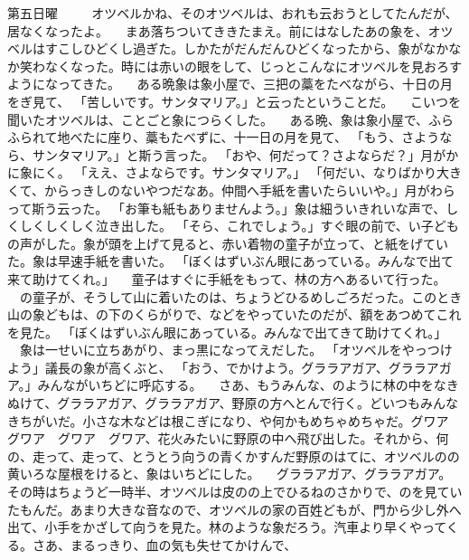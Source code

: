 第五日曜
　
　オツベルかね、そのオツベルは、おれも云おうとしてたんだが、居なくなったよ。
　まあ落ちついてききたまえ。前にはなしたあの象を、オツベルはすこしひどくし過ぎた。しかたがだんだんひどくなったから、象がなかなか笑わなくなった。時には赤いの眼をして、じっとこんなにオツベルを見おろすようになってきた。
　ある晩象は象小屋で、三把の藁をたべながら、十日の月をぎ見て、
「苦しいです。サンタマリア。」と云ったということだ。
　こいつを聞いたオツベルは、ことごと象につらくした。
　ある晩、象は象小屋で、ふらふられて地べたに座り、藁もたべずに、十一日の月を見て、
「もう、さようなら、サンタマリア。」と斯う言った。
「おや、何だって？{}さよならだ？」月がかに象にく。
「ええ、さよならです。サンタマリア。」
「何だい、なりばかり大きくて、からっきしのないやつだなあ。仲間へ手紙を書いたらいいや。」月がわらって斯う云った。
「お筆も紙もありませんよう。」象は細ういきれいな声で、しくしくしくしく泣き出した。
「そら、これでしょう。」すぐ眼の前で、い子どもの声がした。象が頭を上げて見ると、赤い着物の童子が立って、と紙をげていた。象は早速手紙を書いた。
「ぼくはずいぶん眼にあっている。みんなで出て来て助けてくれ。」
　童子はすぐに手紙をもって、林の方へあるいて行った。
　の童子が、そうして山に着いたのは、ちょうどひるめしごろだった。このとき山の象どもは、の下のくらがりで、などをやっていたのだが、額をあつめてこれを見た。
「ぼくはずいぶん眼にあっている。みんなで出てきて助けてくれ。」
　象は一せいに立ちあがり、まっ黒になってえだした。
「オツベルをやっつけよう」議長の象が高くぶと、
「おう、でかけよう。グララアガア、グララアガア。」みんながいちどに呼応する。
　さあ、もうみんな、のように林の中をなきぬけて、グララアガア、グララアガア、野原の方へとんで行く。どいつもみんなきちがいだ。小さな木などは根こぎになり、や何かもめちゃめちゃだ。グワア　グワア　グワア　グワア、花火みたいに野原の中へ飛び出した。それから、何の、走って、走って、とうとう向うの青くかすんだ野原のはてに、オツベルのの黄いろな屋根をけると、象はいちどにした。
　グララアガア、グララアガア。その時はちょうど一時半、オツベルは皮のの上でひるねのさかりで、のを見ていたもんだ。あまり大きな音なので、オツベルの家の百姓どもが、門から少し外へ出て、小手をかざして向うを見た。林のような象だろう。汽車より早くやってくる。さあ、まるっきり、血の気も失せてかけんで、
